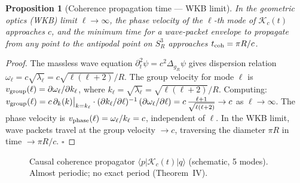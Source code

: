 \documentclass[12pt,a4paper]{article}
\theoremstyle{plain}
\newtheorem{proposition}[theorem]{Proposition}
\theoremstyle{definition}
\theoremstyle{remark}
\begin{document}
\begin{proposition}[Coherence propagation time — WKB limit]
\label{prop:coherence_time}
In the geometric optics (WKB) limit $\ell \to \infty$, the phase velocity of the
$\ell$-th mode of $\mathcal{K}_c(t)$ approaches $c$, and the minimum time for a
wave-packet envelope to propagate from any point to the antipodal point on $S^3_R$
approaches $t_{\rm coh} = \pi R/c$.
\end{proposition}

\begin{proof}
The massless wave equation $\partial_t^2\psi = c^2\Delta_{g_R}\psi$ gives
dispersion relation $\omega_\ell = c\sqrt{\lambda_\ell} = c\sqrt{\ell(\ell+2)}/R$.
The group velocity for mode $\ell$ is
$v_{\rm group}(\ell) = \partial\omega_\ell/\partial k_\ell$,
where $k_\ell = \sqrt{\lambda_\ell} = \sqrt{\ell(\ell+2)}/R$.
Computing:
$v_{\rm group}(\ell) = c\,\partial_k(k)\big|_{k=k_\ell} \cdot
  (\partial k_\ell/\partial\ell)^{-1}\,(\partial\omega_\ell/\partial\ell)
= c\,\frac{\ell+1}{\sqrt{\ell(\ell+2)}} \to c$ as $\ell \to \infty$.
The phase velocity is $v_{\rm phase}(\ell) = \omega_\ell/k_\ell = c$, independent of $\ell$.
In the WKB limit, wave packets travel at the group velocity $\to c$, traversing the
diameter $\pi R$ in time $\to \pi R/c$.
\hfill$\square$
\end{proof}

\begin{figure}[h!]
\centering
{}
\caption{Causal coherence propagator $\langle p|\mathcal{K}_c(t)|q\rangle$
  (schematic, 5 modes). Almost periodic; no exact period (Theorem~IV).}
\label{fig:propagator}
\end{figure}
\end{document}
